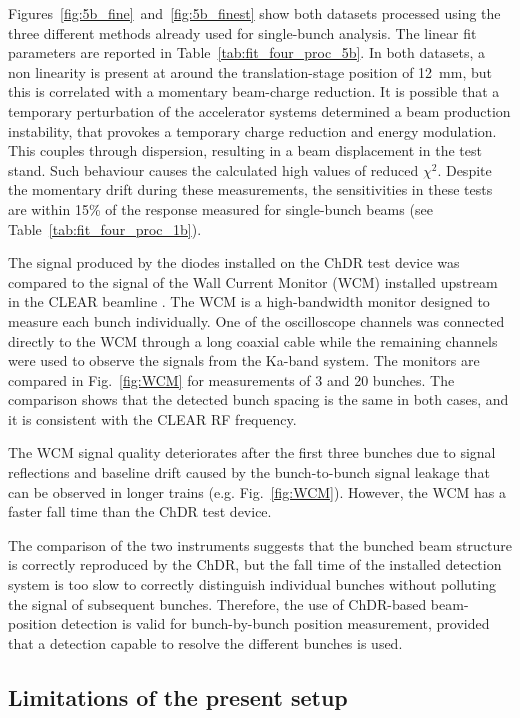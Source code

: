 Figures~\ref{fig:5b_fine}~and~\ref{fig:5b_finest} show both datasets processed using the three different methods already used for single-bunch analysis. The linear fit parameters are reported in Table~\ref{tab:fit_four_proc_5b}. In both datasets, a non linearity is present at around the translation-stage position of 12~mm, but this is correlated with a momentary beam-charge reduction. It is possible that a temporary perturbation of the accelerator systems determined a beam production instability, that provokes a temporary charge reduction and energy modulation. This couples through dispersion, resulting in a beam displacement in the test stand. Such behaviour causes the calculated high values of reduced $\chi^2$. Despite the momentary drift during these measurements, the sensitivities in these tests are within 15\% of the response measured for single-bunch beams (see Table~\ref{tab:fit_four_proc_1b}).



The signal produced by the diodes installed on the ChDR test device was compared to the signal of the  Wall Current Monitor (WCM) installed upstream in the CLEAR beamline \cite{WCM-CLEAR}. The WCM is a high-bandwidth monitor designed to measure each bunch individually. One of the oscilloscope channels was connected directly to the WCM through a long coaxial cable while the remaining channels were used to observe the signals from the Ka-band system. The monitors are compared in Fig.~\ref{fig:WCM} for measurements of 3 and 20 bunches. The comparison shows that the detected bunch spacing is the same in both cases, and it is consistent with the CLEAR RF frequency. 

The WCM signal quality deteriorates after the first three bunches due to signal reflections and baseline drift caused by the bunch-to-bunch signal leakage that can be observed in longer trains (e.g. Fig.~\ref{fig:WCM}). However, the WCM has a faster fall time than the ChDR test device.

The comparison of the two instruments suggests that the bunched beam structure is correctly reproduced by the ChDR, but the fall time of the installed detection system is too slow to correctly distinguish individual bunches without polluting the signal of subsequent bunches. Therefore, the use of ChDR-based beam-position detection is valid for bunch-by-bunch position measurement, provided that a detection capable to resolve the different bunches is used.




\subsection{Limitations of the present setup  }\label{sec:diodes_leakage}

